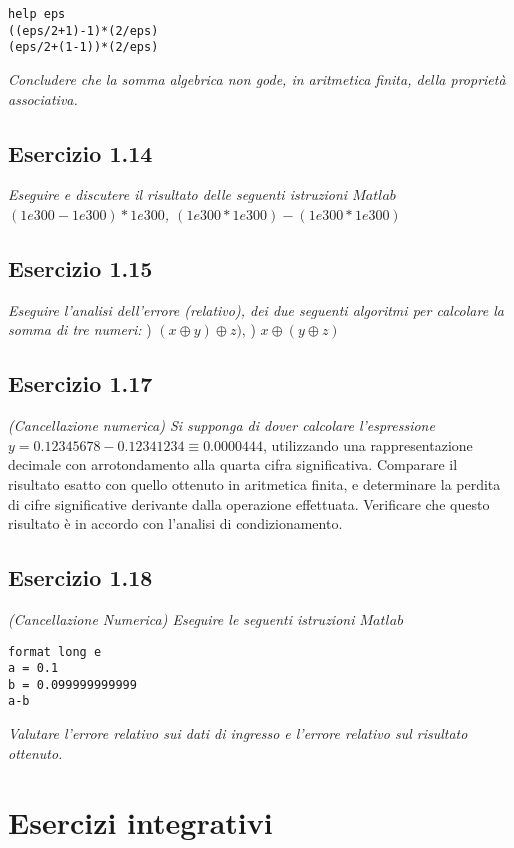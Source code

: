 \lstset{language=Matlab}
\begin{lstlisting}
help eps
((eps/2+1)-1)*(2/eps)
(eps/2+(1-1))*(2/eps)
\end{lstlisting}
\emph{Concludere che la somma algebrica non gode, in aritmetica finita, della proprietà associativa.}

\subsection{Esercizio 1.14}
\emph{Eseguire e discutere il risultato delle seguenti istruzioni $Matlab$}
\emph{\center $(1e300-1e300)*1e300$, \qquad $(1e300*1e300)-(1e300*1e300)$}
\flushleft

\subsection{Esercizio 1.15}
\emph{Eseguire l'analisi dell'errore (relativo), dei due seguenti algoritmi per calcolare la somma di tre numeri:}
) $ (x\oplus y) \oplus z) $, ) $x\oplus(y\oplus z)$
\flushleft

\subsection{Esercizio 1.17}
\emph{(Cancellazione numerica) Si supponga di dover calcolare l'espressione }
\center $ y = 0.12345678-0.12341234 \equiv 0.0000444$,
\flushleft utilizzando una rappresentazione decimale con arrotondamento alla quarta cifra significativa. Comparare il risultato esatto con quello ottenuto in aritmetica finita, e determinare la perdita di cifre significative derivante dalla operazione effettuata. Verificare che questo risultato è in accordo con l'analisi di condizionamento.

\subsection{Esercizio 1.18}
\emph{(Cancellazione Numerica) Eseguire le seguenti istruzioni $Matlab$}

\lstset{language=Matlab}
\begin{lstlisting}
format long e
a = 0.1
b = 0.099999999999
a-b
\end{lstlisting}
\emph{Valutare l'errore relativo sui dati di ingresso e l'errore relativo sul risultato ottenuto.}

\section{Esercizi integrativi}
\label{chap:Esercizi integrativi}

